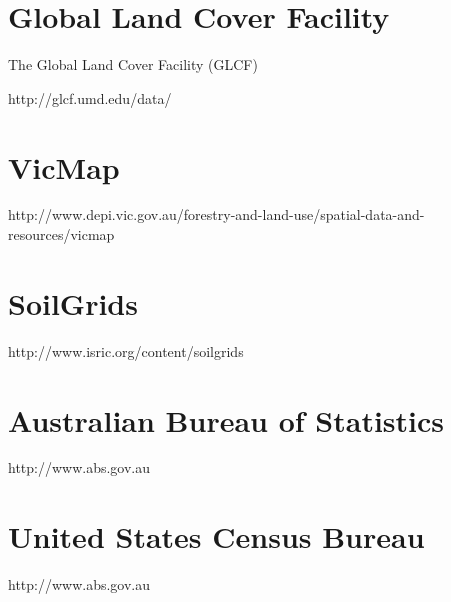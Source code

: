 \section{Global Land Cover Facility}

The Global Land Cover Facility (GLCF)

http://glcf.umd.edu/data/

\section{VicMap}

http://www.depi.vic.gov.au/forestry-and-land-use/spatial-data-and-resources/vicmap

\section{SoilGrids}

http://www.isric.org/content/soilgrids

\section{Australian Bureau of Statistics}

http://www.abs.gov.au

\section{United States Census Bureau}

http://www.abs.gov.au
